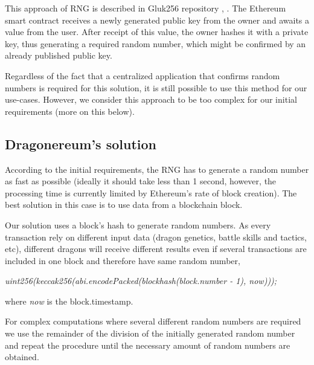 \documentclass[12pt]{article}
\begin{document}
This approach of RNG is described in Gluk256 repository  \cite{Dao_Casino_Ksenya_Serova_2017_Jun_27},  \cite{Gluk256_2016_Aug_26}. The Ethereum smart contract receives a newly generated public key from the owner and awaits a value from the user. After receipt of this value, the owner hashes it with a private key, thus generating a required random number, which might be confirmed by an already published public key.\par

Regardless of the fact that a centralized application that confirms random numbers is required for this solution, it is still possible to use this method for our use-cases. However, we consider this approach to be too complex for our initial requirements (more on this below).\par

\vspace{\baselineskip}
\subsection{Dragonereum’s solution}
\label{Dragonereums solution}  \par

According to the initial requirements, the RNG has to generate a random number as fast as possible (ideally it should take less than 1 second, however, the processing time is currently limited by Ethereum’s rate of block creation). The best solution in this case is to use data from a blockchain block.\par

Our solution uses a block’s hash to generate random numbers. As every transaction rely on different input data (dragon genetics, battle skills and tactics, etc), different dragons will receive different results even if several transactions are included in one block and therefore have same random number,\par

\begin{Center}
\textit{uint256(keccak256(abi.encodePacked(blockhash(block.number - 1), now)));}
\end{Center}\par

where\tab \textit{ now} is the block.timestamp.\par

For complex computations where several different random numbers are required we use the remainder of the division of the initially generated random number and repeat the procedure until the necessary amount of random numbers are obtained.\par
\end{document}
